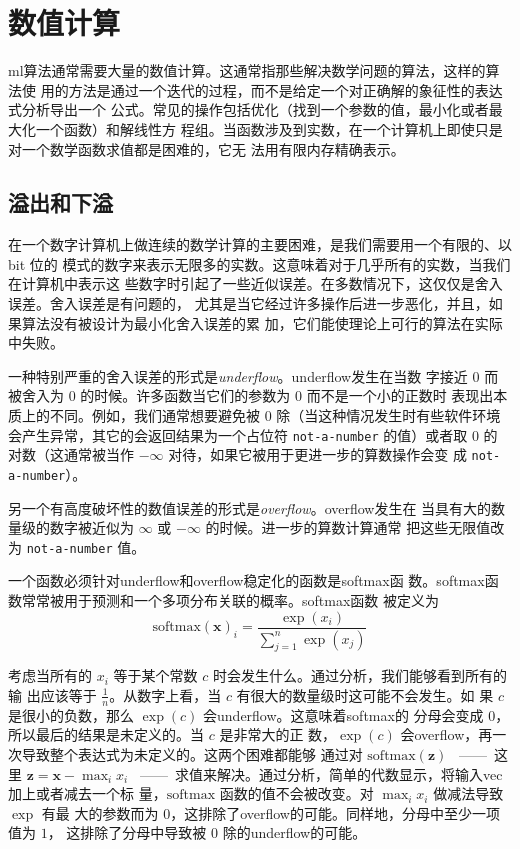 \chapter{数值计算}
\label{ch:numerical}

\gls*{ml}算法通常需要大量的数值计算。这通常指那些解决数学问题的算法，这样的算法使
用的方法是通过一个迭代的过程，而不是给定一个对正确解的象征性的表达式分析导出一个
公式。常见的操作包括优化（找到一个参数的值，最小化或者最大化一个函数）和解线性方
程组。当函数涉及到实数，在一个计算机上即使只是对一个数学函数求值都是困难的，它无
法用有限内存精确表示。

\section{溢出和下溢}
\label{sec:overflow_and_underflow}

在一个数字计算机上做连续的数学计算的主要困难，是我们需要用一个有限的、以 bit 位的
模式的数字来表示无限多的实数。这意味着对于几乎所有的实数，当我们在计算机中表示这
些数字时引起了一些近似误差。在多数情况下，这仅仅是舍入误差。舍入误差是有问题的，
尤其是当它经过许多操作后进一步恶化，并且，如果算法没有被设计为最小化舍入误差的累
加，它们能使理论上可行的算法在实际中失败。

一种特别严重的舍入误差的形式是\emph{\gls{underflow}}。\gls*{underflow}发生在当数
字接近 $0$ 而被舍入为 $0$ 的时候。许多函数当它们的参数为 $0$ 而不是一个小的正数时
表现出本质上的不同。例如，我们通常想要避免被 $0$ 除（当这种情况发生时有些软件环境
会产生异常，其它的会返回结果为一个占位符 \verb!not-a-number! 的值）或者取 $0$ 的
对数（这通常被当作 $-\infty$ 对待，如果它被用于更进一步的算数操作会变
成 \verb!not-a-number!）。

另一个有高度破坏性的数值误差的形式是\emph{\gls{overflow}}。\gls*{overflow}发生在
当具有大的数量级的数字被近似为 $\infty$ 或 $-\infty$ 的时候。进一步的算数计算通常
把这些无限值改为 \verb!not-a-number! 值。

一个函数必须针对\gls*{underflow}和\gls*{overflow}稳定化的函数是\gls*{softmax}函
数。\gls*{softmax}函数常常被用于预测和一个多项分布关联的概率。\gls*{softmax}函数
被定义为
\begin{equation}
  \mathrm{softmax}(\pmb{x})_i = \frac{\exp(x_i)}{\sum_{j=1}^n\exp(x_j)}
\end{equation}

考虑当所有的 $x_i$ 等于某个常数 $c$ 时会发生什么。通过分析，我们能够看到所有的输
出应该等于 $\frac{1}{n}$。从数字上看，当 $c$ 有很大的数量级时这可能不会发生。如
果 $c$ 是很小的负数，那么 $\exp(c)$ 会\gls*{underflow}。这意味着\gls*{softmax}的
分母会变成 $0$，所以最后的结果是未定义的。当 $c$ 是非常大的正
数，$\exp(c)$ 会\gls*{overflow}，再一次导致整个表达式为未定义的。这两个困难都能够
通过对 $\mathrm{softmax}(\pmb{z})$ ~——~这里 $\pmb{z} = \pmb{x} - \max_ix_i$
~——~求值来解决。通过分析，简单的代数显示，将输入\gls*{vec}加上或者减去一个标
量，$\mathrm{softmax}$ 函数的值不会被改变。对 $\max_ix_i$ 做减法导致 $\exp$ 有最
大的参数而为 $0$，这排除了\gls*{overflow}的可能。同样地，分母中至少一项值为 $1$，
这排除了分母中导致被 $0$ 除的\gls*{underflow}的可能。

